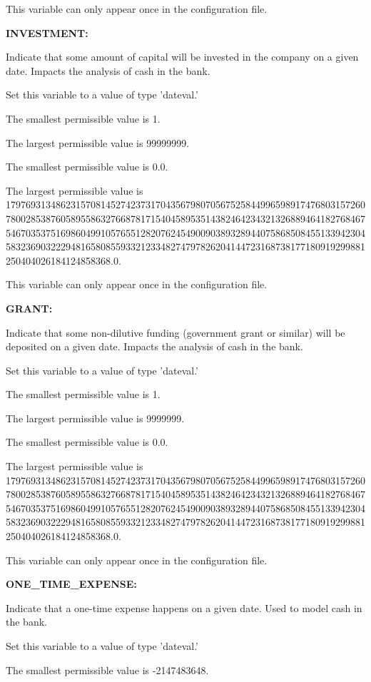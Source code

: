 This variable can only appear once in the configuration file.


\textbf{INVESTMENT:}


Indicate that some amount of capital will be invested in the company on a given date.  Impacts the analysis of cash in the bank.

Set this variable to a value of type 'dateval.'

The smallest permissible value is 1.

The largest permissible value is 99999999.

The smallest permissible value is 0.0.

The largest permissible value is 179769313486231570814527423731704356798070567525844996598917476803157260780028538760589558632766878171540458953514382464234321326889464182768467546703537516986049910576551282076245490090389328944075868508455133942304583236903222948165808559332123348274797826204144723168738177180919299881250404026184124858368.0.

This variable can only appear once in the configuration file.


\textbf{GRANT:}


Indicate that some non-dilutive funding (government grant or similar) will be deposited on a given date.  Impacts the analysis of cash in the bank.

Set this variable to a value of type 'dateval.'

The smallest permissible value is 1.

The largest permissible value is 9999999.

The smallest permissible value is 0.0.

The largest permissible value is 179769313486231570814527423731704356798070567525844996598917476803157260780028538760589558632766878171540458953514382464234321326889464182768467546703537516986049910576551282076245490090389328944075868508455133942304583236903222948165808559332123348274797826204144723168738177180919299881250404026184124858368.0.

This variable can only appear once in the configuration file.


\textbf{ONE\_TIME\_EXPENSE:}


Indicate that a one-time expense happens on a given date.  Used to model cash in the bank.

Set this variable to a value of type 'dateval.'

The smallest permissible value is -2147483648.

